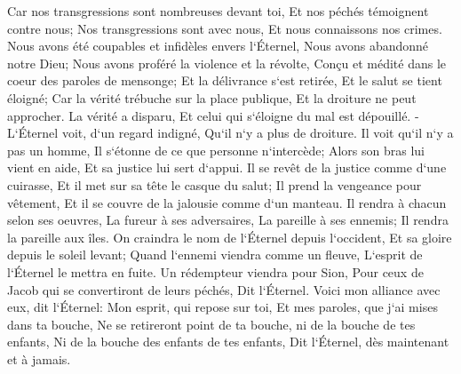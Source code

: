 \verse Car nos transgressions sont nombreuses devant toi, Et nos péchés témoignent contre nous; Nos transgressions sont avec nous, Et nous connaissons nos crimes. 
\verse Nous avons été coupables et infidèles envers l`Éternel, Nous avons abandonné notre Dieu; Nous avons proféré la violence et la révolte, Conçu et médité dans le coeur des paroles de mensonge; 
\verse Et la délivrance s`est retirée, Et le salut se tient éloigné; Car la vérité trébuche sur la place publique, Et la droiture ne peut approcher. 
\verse La vérité a disparu, Et celui qui s`éloigne du mal est dépouillé. -L`Éternel voit, d`un regard indigné, Qu`il n`y a plus de droiture. 
\verse Il voit qu`il n`y a pas un homme, Il s`étonne de ce que personne n`intercède; Alors son bras lui vient en aide, Et sa justice lui sert d`appui. 
\verse Il se revêt de la justice comme d`une cuirasse, Et il met sur sa tête le casque du salut; Il prend la vengeance pour vêtement, Et il se couvre de la jalousie comme d`un manteau. 
\verse Il rendra à chacun selon ses oeuvres, La fureur à ses adversaires, La pareille à ses ennemis; Il rendra la pareille aux îles. 
\verse On craindra le nom de l`Éternel depuis l`occident, Et sa gloire depuis le soleil levant; Quand l`ennemi viendra comme un fleuve, L`esprit de l`Éternel le mettra en fuite. 
\verse Un rédempteur viendra pour Sion, Pour ceux de Jacob qui se convertiront de leurs péchés, Dit l`Éternel. 
\verse Voici mon alliance avec eux, dit l`Éternel: Mon esprit, qui repose sur toi, Et mes paroles, que j`ai mises dans ta bouche, Ne se retireront point de ta bouche, ni de la bouche de tes enfants, Ni de la bouche des enfants de tes enfants, Dit l`Éternel, dès maintenant et à jamais. 


